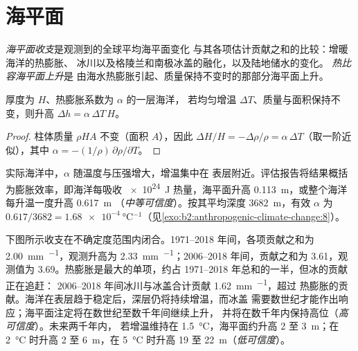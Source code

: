 \section{海平面}\label{sec:b2:anthropogenic-climate-change:sea-level}

\begin{definition}\label{def:b2:anthropogenic-climate-change:sea-level}
\emph{海平面收支}是观测到的全球平均海平面变化
与其各项估计贡献之和的比较：增暖海洋的热膨胀、
冰川以及格陵兰和南极冰盖的融化，以及陆地储水的变化。
\emph{热比容海平面上升}是
由海水热膨胀引起、质量保持不变时的那部分海平面上升。
\end{definition}

\begin{proposition}[一层海洋的热膨胀]\label{prop:b2:anthropogenic-climate-change:thermosteric}
厚度为 $H$、热膨胀系数为 $\alpha$ 的一层海洋，
若均匀增温 $\Delta T$、质量与面积保持不变，则升高 $\Delta h = \alpha\,\Delta T\,H$。
\end{proposition}
\begin{proof}
柱体质量 $\rho H A$ 不变（面积 $A$），因此 $\Delta H/H = -\Delta\rho/\rho =
\alpha\,\Delta T$（取一阶近似），其中 $\alpha = -(1/\rho)\,\partial\rho/\partial T$。
\end{proof}

实际海洋中，$\alpha$ 随温度与压强增大，增温集中在
表层附近。评估报告将结果概括为膨胀效率，即海洋每吸收
\qty{e24}{J} 热量，海平面升高 \qty{0.113}{m}，或整个海洋每升温一度升高 \qty{0.617}{m}
（\emph{中等可信度}）。按其平均深度 \qty{3682}{m}，有效 $\alpha$ 为
$0.617/3682 = \qty{1.68e-4}{\celsius^{-1}}$（见\cref{exo:b2:anthropogenic-climate-change:8}）。

下图所示收支在不确定度范围内闭合。1971--2018 年间，各项贡献之和为
\qty{2.00}{mm.^{-1}}，观测升高为 \qty{2.33}{mm.^{-1}}；2006--2018 年间，贡献之和为
3.61，观测值为 3.69。热膨胀是最大的单项，约占 1971--2018 年总和的一半，但冰的贡献正在追赶：
2006--2018 年间冰川与冰盖合计贡献 \qty{1.62}{mm.^{-1}}，超过
热膨胀的贡献。海洋在表层趋于稳定后，深层仍将持续增温，而冰盖
需要数世纪才能作出响应；海平面注定将在数世纪至数千年间继续上升，
并将在数千年内保持高位（\emph{高可信度}）。未来两千年内，
若增温维持在 \qty{1.5}{\celsius}，海平面约升高 2 至 \qty{3}{m}；在 \qty{2}{\celsius} 时升高 2 至
\qty{6}{m}，在 \qty{5}{\celsius} 时升高 19 至 \qty{22}{m}（\emph{低可信度}）。

